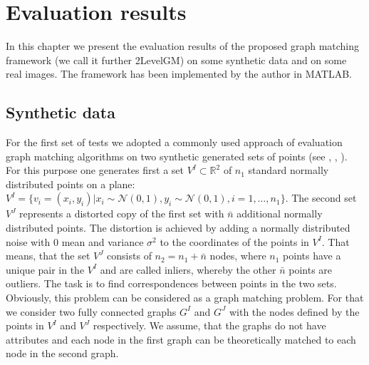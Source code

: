 \chapter{Evaluation results} \label{chapter:results}

In this chapter we present the evaluation results of the proposed graph matching framework (we call it further 2LevelGM) on some synthetic data and on some real images. The framework has been implemented by the author in MATLAB.

\section{Synthetic data}
For the first set of tests we adopted a commonly used approach of evaluation graph matching algorithms on two synthetic generated sets of points (see \cite{Cho2014_Haystack}, \cite{Cho2010_RRWM}, \cite{Leordeanu2009_IPFP}). 
For this purpose one generates first a set $V^I\subset\mathbb{R}^2$ of $n_1$ standard normally distributed points on a plane: $V^I=\{v_i=(x_i,y_i)|x_i\sim\mathcal{N}(0,1),y_i\sim\mathcal{N}(0,1),i=1,\dots,n_1\}$. The second set $V^J$ represents a distorted copy of the first set with $\bar{n}$ additional normally distributed points. The distortion is achieved by adding a normally distributed noise with $0$ mean and variance $\sigma^2$ to the coordinates of the points in $V^I$. That means, that the set $V^J$ consists of $n_2=n_1+\bar{n}$ nodes, where $n_1$ points have a unique pair in the $V^I$ and are called inliers, whereby the other $\bar{n}$ points are outliers. The task is to find correspondences between points in the two sets.
Obviously, this problem can be considered as a graph matching problem. For that we consider two fully connected graphs $G^I$ and $G^J$ with the nodes defined by the points in $V^I$ and $V^J$ respectively. We assume, that the graphs do not have attributes and each node in the first graph can be theoretically matched to each node in the second graph.

